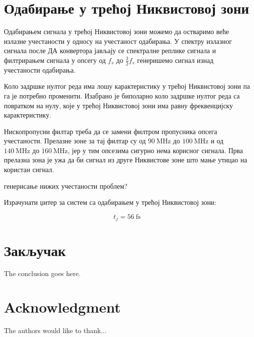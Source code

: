 \documentclass[conference]{IEEEJERM}
\begin{document}
\section{Одабирање у трећој Никвистовој зони}

Одабирањем сигнала у трећој Никвистовој зони можемо да остваримо веће излазне учестаности у односу на учестаност одабирања. У спектру излазног сигнала после ДА конвертора јављају се спектралне реплике сигнала и филтрирањем сигнала у опсегу од $f_s$ до $\frac{3}{2} f_s $ генеришемо сигнал изнад учестаности одабирања.

Коло задршке нултог реда има лошу карактеристику у трећој Никвистовој зони па га је потребно променити. Изабрано је биполарно коло задршке нултог реда са повратком на нулу, које у трећој Никвистовој зони има равну фреквенцијску карактеристику.

Нископропусни филтар треба да се замени филтром пропусника опсега учестаности. Прелазне зоне за тај филтар су од $\SI{90}{\mega\hertz}$ до $\SI{100}{\mega\hertz}$ и од $\SI{140}{\mega\hertz}$ до $\SI{160}{\mega\hertz}$, јер у тим опсезима сигурно нема корисног сигнала. Прва прелазна зона је ужа да би сигнал из друге Никвистове зоне што мање утицао на користан сигнал. 

генерисање нижих учестаности проблем?

Израчунати џитер за систем са одабирањем у трећој Никвистовој зони:

\begin{equation}
t_{j} = \SI{56}{\femto\second}
\end{equation}





\section{Закључак}
The conclusion goes here.




\section*{Acknowledgment}


The authors would like to thank...


\begin{thebibliography}{1}


\end{thebibliography}
\end{document}
